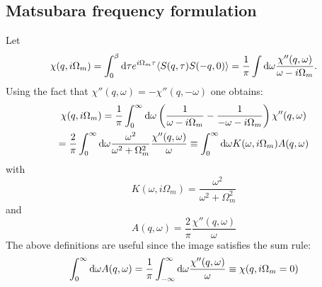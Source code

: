 \documentclass[12pt]{article}
\begin{document}
\subsection{Matsubara frequency  formulation}

Let 
\begin{equation}
  \chi(q,i\Omega_m) = \int_0^{\beta} {\rm d} \tau  e^{i \Omega_m \tau}
	\langle S(q,\tau) S(-q,0) \rangle  = \frac{1}{\pi}
   \int {\rm d} \omega  \frac{\chi''(q,\omega)}{ \omega - i \Omega_m }.
\end{equation}
Using the fact that $\chi''(q,\omega) = -\chi''(q,-\omega)$ one obtains:
\begin{equation}
\begin{gathered}
  \chi(q,i\Omega_m) = 
	\frac{1}{\pi}
   \int_0^{\infty} {\rm d} \omega \left(\frac{1}{ \omega - i \Omega_m } - \frac{1}{ -\omega - i \Omega_m } \right)
         \chi''(q,\omega) \\
    = \frac{2}{\pi} \int_0^{\infty} {\rm d} \omega \frac{\omega^2}{ \omega^2  + \Omega_m^2 } 
  \frac{\chi''(q,\omega)}{\omega} 
   \equiv \int_0^{\infty} {\rm d} \omega K(\omega,i\Omega_m) A(q,\omega)
\end{gathered}
\end{equation}
with
\begin{equation}
   K(\omega,i\Omega_m) = \frac{\omega^2}{ \omega^2  + \Omega_m^2 } 
\end{equation}
and
\begin{equation}
A(q,\omega) =  \frac{2}{\pi}   \frac{\chi''(q,\omega)}{\omega} 
\end{equation}
The above definitions are useful since the image satisfies the sum rule:
\begin{equation}
\int_0^{\infty} {\rm d} \omega A(q,\omega) =  \frac{1}{\pi}  \int_{-\infty}^{\infty} {\rm d} \omega 
   \frac{\chi''(q,\omega)}{\omega}   \equiv \chi(q,i\Omega_m=0)
\end{equation}
\end{document}
